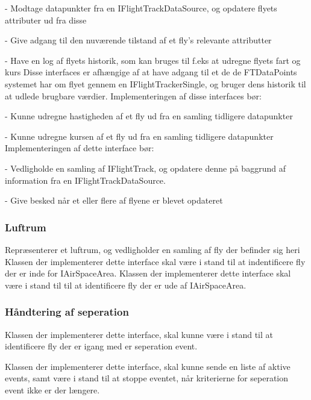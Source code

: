 - Modtage datapunkter fra en IFlightTrackDataSource, og opdatere flyets attributer ud fra disse

- Give adgang til den nuværende tilstand af et fly's relevante attributter

- Have en log af flyets historik, som kan bruges til f.eks at udregne flyets fart og kurs
Disse interfaces er afhængige af at have adgang til et de de FTDataPoints systemet har om flyet gennem en IFlightTrackerSingle, og bruger dens historik til at udlede brugbare værdier.
Implementeringen af disse interfaces bør:

- Kunne udregne hastigheden af et fly ud fra en samling tidligere datapunkter

- Kunne udregne kursen af et fly ud fra en samling tidligere datapunkter
Implementeringen af dette interface bør:

- Vedligholde en samling af IFlightTrack, og opdatere denne på baggrund af information fra en IFlightTrackDataSource.

- Give besked når et eller flere af flyene er blevet opdateret


\subsubsection{Luftrum}

Repræsenterer et luftrum, og vedligholder en samling af fly der befinder sig heri
Klassen der implementerer dette interface skal være i stand til at indentificere fly der er inde for IAirSpaceArea.
Klassen der implementerer dette interface skal være i stand til til at identificere fly der er ude af IAirSpaceArea.


\subsubsection{Håndtering af seperation}
Klassen der implementerer dette interface, skal kunne være i stand til at identificere fly der er igang med er seperation event.

Klassen der implementerer dette interface, skal kunne sende en liste af aktive events, samt være i stand til at stoppe eventet, når kriterierne for seperation event ikke er der længere.
